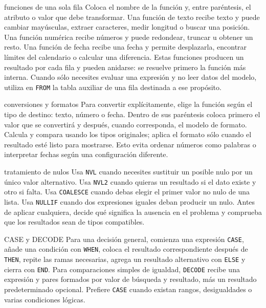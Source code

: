 \documentclass[11pt,a4paper]{article}
\newcommand{\campo}[1]{\texttt{#1}}
\begin{document}
\begin{plantilla}{funciones de una sola fila}
Coloca el nombre de la función y, entre paréntesis, el atributo o valor que debe transformar. Una
función de texto recibe texto y puede cambiar mayúsculas, extraer caracteres, medir longitud o buscar
una posición. Una función numérica recibe números y puede redondear, truncar u obtener un resto. Una
función de fecha recibe una fecha y permite desplazarla, encontrar límites del calendario o calcular
una diferencia. Estas funciones producen un resultado por cada fila y pueden anidarse: se resuelve
primero la función más interna. Cuando sólo necesites evaluar una expresión y no leer datos del
modelo, utiliza en \campo{FROM} la tabla auxiliar de una fila destinada a ese propósito.
\end{plantilla}

\begin{plantilla}{conversiones y formatos}
Para convertir explícitamente, elige la función según el tipo de destino: texto, número o fecha.
Dentro de sus paréntesis coloca primero el valor que se convertirá y después, cuando corresponda, el
modelo de formato. Calcula y compara usando los tipos originales; aplica el formato sólo cuando el
resultado esté listo para mostrarse. Esto evita ordenar números como palabras o interpretar fechas
según una configuración diferente.
\end{plantilla}

\begin{plantilla}{tratamiento de nulos}
Usa \campo{NVL} cuando necesites sustituir un posible nulo por un único valor alternativo. Usa
\campo{NVL2} cuando quieras un resultado si el dato existe y otro si falta. Usa \campo{COALESCE}
cuando debas elegir el primer valor no nulo de una lista. Usa \campo{NULLIF} cuando dos expresiones
iguales deban producir un nulo. Antes de aplicar cualquiera, decide qué significa la ausencia en el
problema y comprueba que los resultados sean de tipos compatibles.
\end{plantilla}

\begin{plantilla}{CASE y DECODE}
Para una decisión general, comienza una expresión \campo{CASE}, añade una condición con
\campo{WHEN}, coloca el resultado correspondiente después de \campo{THEN}, repite las ramas
necesarias, agrega un resultado alternativo con \campo{ELSE} y cierra con \campo{END}. Para
comparaciones simples de igualdad, \campo{DECODE} recibe una expresión y pares formados por valor de
búsqueda y resultado, más un resultado predeterminado opcional. Prefiere \campo{CASE} cuando existan
rangos, desigualdades o varias condiciones lógicas.
\end{plantilla}
\end{document}
